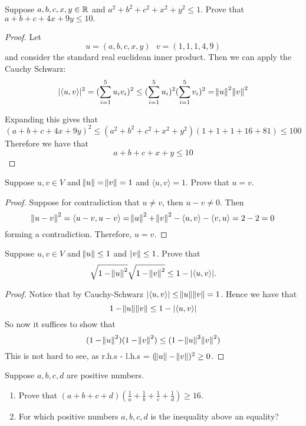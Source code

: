 \documentclass{extarticle}
\begin{document}
\begin{problem}{8}
    Suppose \(a,b,c,x,y \in \mathbb{R}\) and \(a^2 + b^2 + c^2 + x^2 + y^2 \leq 1\). Prove that 
    \(a + b + c + 4x + 9y \leq 10.\)
\end{problem}

\begin{proof}
Let 
\[u = (a, b, c, x, y) \ \ \ v = (1, 1, 1, 4, 9)\]
and consider the standard real euclidean inner product. Then we can apply the Cauchy Schwarz:
\[|\langle u,v \rangle|^2 = (\sum_{i=1}^{5}u_iv_i)^2 \leq (\sum_{i=1}^{5} u_i)^2 (\sum_{i=1}^{5}v_i)^2 = \norm{u}^2 \norm{v}^2\]

Expanding this gives that 
\[(a + b + c + 4x + 9y)^2 \leq (a^2+b^2+c^2+x^2+y^2)(1+1+1+16+81) \leq 100\] 
Therefore we have that 
\[a + b + c + x + y \leq 10\]

\end{proof}

\begin{problem}{9}
    Suppose \(u, v \in V\) and \(\norm{u} = \norm{v} = 1\) and \(\langle u,v \rangle = 1\). Prove 
    that \(u = v\).
\end{problem}

\begin{proof}
Suppose for contradiction that \(u \neq v\), then \(u - v \neq 0\). Then 
\[\norm{u - v}^2 = \langle u-v,u-v \rangle = \norm{u}^2 + \norm{v}^2 - \langle u,v \rangle 
- \langle v,u \rangle= 2 - 2 = 0\]
forming a contradiction. Therefore, \(u = v\).
\end{proof}



\begin{problem}{10}
    Suppose \(u, v \in V\) and \(\norm{u} \leq 1\) and \(\norm{v} \leq 1\). Prove that 
    \[\sqrt{1 - \norm{u}^2} \sqrt{1 - \norm{v}^2} \leq 1 - |\langle u,v \rangle|.\]
\end{problem}

\begin{proof}
Notice that by Cauchy-Schwarz \( |\langle u,v \rangle| \leq \norm{u}\norm{v} = 1\). Hence we have that 
\[1 - \norm{u} \norm{v} \leq 1 - |\langle u,v \rangle|\]
So now it suffices to show that 
\[(1 - \norm{u}^2)(1 - \norm{v}^2) \leq (1 - \norm{u}^2 \norm{v}^2)\]
This is not hard to see, as r.h.s - l.h.s = \((\norm{u} - \norm{v})^2 \geq 0\).
\end{proof}


\begin{problem}{12}
    Suppose \(a,b,c,d\) are positive numbers. 
    \begin{enumerate}[label=(\alph*)]
        \item Prove that \((a+b+c+d)(\frac{1}{a} + \frac{1}{b} + \frac{1}{c} + \frac{1}{d}) \geq 16\). 
        \item For which positive numbers \(a,b,c,d\) is the inequality above an equality?
    \end{enumerate}
\end{problem}
\end{document}
